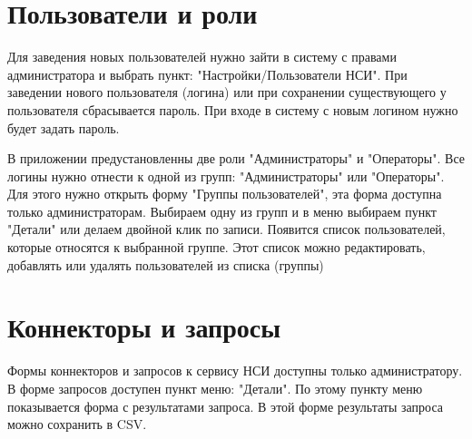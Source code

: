\documentclass[12pt, a4paper]{article}
\begin{document}
\section{Пользователи и роли}
Для заведения новых пользователей нужно зайти в систему с правами администратора и выбрать пункт: "Настройки/Пользователи НСИ".
При заведении нового пользователя (логина) или при сохранении существующего у пользователя сбрасывается пароль. 
При входе в систему с новым логином нужно будет задать пароль.

В приложении предустановленны две роли "Администраторы" и "Операторы". 
Все логины нужно отнести к одной из групп: "Администраторы" или "Операторы". 
Для этого нужно открыть форму "Группы пользователей", эта форма доступна только администраторам. 
Выбираем одну из групп и в меню выбираем пункт "Детали" или делаем двойной клик по записи. 
Появится список пользователей, которые относятся к выбранной группе. 
Этот список можно редактировать, добавлять или удалять пользователей из списка (группы)



\section{Коннекторы и запросы} 
Формы коннекторов и запросов к сервису НСИ доступны только администратору. 
В форме запросов доступен пункт меню: "Детали". По этому пункту меню показывается форма 
с результатами запроса. В этой форме результаты запроса можно сохранить в CSV.
\end{document}
